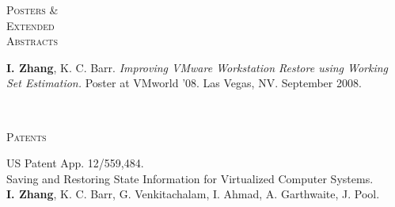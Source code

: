 \documentclass[10pt,times]{report}
\newlength{\sectiongap}
\newlength{\sectioncolwidth}
\newlength{\colgap}
\newlength{\stuffwidth}
\newenvironment{rtable}{
  \begin{minipage}{\textwidth}
  }{
  \end{minipage}
}
\newenvironment{rsection}[1]{
  \begin{minipage}[t]{\sectioncolwidth}
    \textsc{#1}
  \end{minipage}
  \hspace{\colgap}
  \begin{minipage}[t]{\stuffwidth}
  }{
    \removelastskip
  \end{minipage}
  \\[\sectiongap]
}
\begin{document}
\begin{rtable}
\begin{rsection}{Posters \&\\Extended\\Abstracts}
   \textbf{I. Zhang}, K. C. Barr. \textit{Improving VMware Workstation Restore
      using Working Set Estimation.} Poster at VMworld '08. Las Vegas,
    NV. September 2008.
  \end{rsection}

  \vspace{1.0em}
  \begin{rsection}{Patents}
    US Patent App. 12/559,484.\\
    Saving and Restoring State Information for Virtualized Computer Systems.\\
    \textbf{I. Zhang}, K. C. Barr, G. Venkitachalam, I. Ahmad, A. Garthwaite, J. Pool.\\\vspace{-0.5em}
    
  \end{rsection}


\end{rtable}
\end{document}
